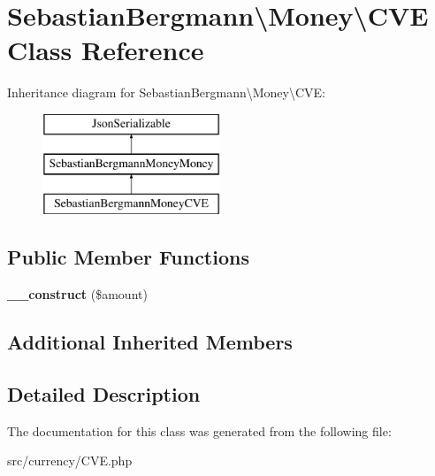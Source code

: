 \hypertarget{classSebastianBergmann_1_1Money_1_1CVE}{}\section{Sebastian\+Bergmann\textbackslash{}Money\textbackslash{}C\+V\+E Class Reference}
\label{classSebastianBergmann_1_1Money_1_1CVE}
Inheritance diagram for Sebastian\+Bergmann\textbackslash{}Money\textbackslash{}C\+V\+E\+:\begin{figure}[H]
\begin{center}
\leavevmode
\includegraphics[height=3.000000cm]{classSebastianBergmann_1_1Money_1_1CVE}
\end{center}
\end{figure}
\subsection*{Public Member Functions}
\begin{DoxyCompactItemize}
\item 
\hypertarget{classSebastianBergmann_1_1Money_1_1CVE_ab924ac08d3eb2f13c14c2e6192c9b1d0}{}{\bfseries \+\_\+\+\_\+construct} (\$amount)\label{classSebastianBergmann_1_1Money_1_1CVE_ab924ac08d3eb2f13c14c2e6192c9b1d0}

\end{DoxyCompactItemize}
\subsection*{Additional Inherited Members}


\subsection{Detailed Description}


The documentation for this class was generated from the following file\+:\begin{DoxyCompactItemize}
\item 
src/currency/C\+V\+E.\+php\end{DoxyCompactItemize}
